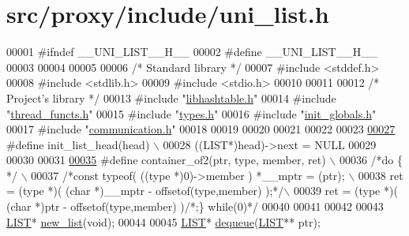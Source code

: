 \hypertarget{uni__list_8h_source}{
\section{src/proxy/include/uni\_\-list.h}
}

\begin{DoxyCode}
00001 \textcolor{preprocessor}{#ifndef \_\_UNI\_LIST\_\_H\_\_}
00002 \textcolor{preprocessor}{}\textcolor{preprocessor}{#define \_\_UNI\_LIST\_\_H\_\_}
00003 \textcolor{preprocessor}{}
00004 
00005 
00006         \textcolor{comment}{/*      Standard library        */}
00007 \textcolor{preprocessor}{#include        <stddef.h>}
00008 \textcolor{preprocessor}{#include        <stdlib.h>}
00009 \textcolor{preprocessor}{#include        <stdio.h>}
00010 
00011 
00012         \textcolor{comment}{/*      Project's library       */}
00013 \textcolor{preprocessor}{#include        "\hyperlink{proxy_2include_2libhashtable_8h}{libhashtable.h}"}
00014 \textcolor{preprocessor}{#include        "\hyperlink{thread__functs_8h}{thread_functs.h}"}
00015 \textcolor{preprocessor}{#include        "\hyperlink{types_8h}{types.h}"}
00016 \textcolor{preprocessor}{#include        "\hyperlink{init__globals_8h}{init_globals.h}"}
00017 \textcolor{preprocessor}{#include        "\hyperlink{communication_8h}{communication.h}"}
00018 
00019 
00020 
00021 
00022 
00023 
\hypertarget{uni__list_8h_source_l00027}{}\hyperlink{uni__list_8h_ae49e3fa44233ce660ab817ffecbecc96}{00027} \textcolor{preprocessor}{#define init\_list\_head(head) \(\backslash\)}
00028 \textcolor{preprocessor}{        ((LIST*)head)->next = NULL}
00029 \textcolor{preprocessor}{}
00030 
00031 
\hypertarget{uni__list_8h_source_l00035}{}\hyperlink{uni__list_8h_a852666257c741fda09ea02e1998cd4ae}{00035} \textcolor{preprocessor}{#define container\_of2(ptr, type, member, ret)                   \(\backslash\)}
00036 \textcolor{preprocessor}{        }\textcolor{comment}{/*do \{          */}                                      \(\backslash\)
00037         \textcolor{comment}{/*const typeof( ((type *)0)->member ) *\_\_mptr = (ptr);  \(\backslash\)}
00038 \textcolor{comment}{        ret = (type *)( (char *)\_\_mptr - offsetof(type,member) );*/}\(\backslash\)
00039         ret = (type *)( (char *)ptr - offsetof(type,member) )\textcolor{comment}{/*;\} while(0)*/}
00040 
00041 
00042 
00043 \hyperlink{struct____mialista____}{LIST}* \hyperlink{uni__list_8h_a58f899f6297a4b361d38dc5a57036fca}{new_list}(\textcolor{keywordtype}{void});
00044 
00045 \hyperlink{struct____mialista____}{LIST}* \hyperlink{uni__list_8h_a4bd2b3e90322306f37a038d728eae005}{dequeue}(\hyperlink{struct____mialista____}{LIST}** ptr);

\end{DoxyCode}
